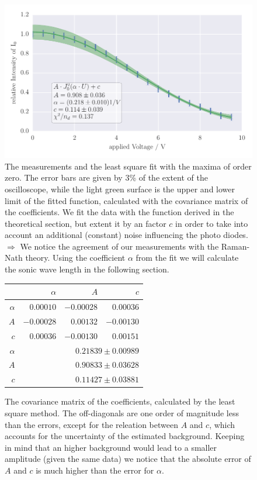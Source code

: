 \begin{figure}
    \centering
    \includegraphics[width=1\textwidth]{analysis/figures/besselfit_000}
    \caption{The measurements and the least square fit with the maxima of order zero. 
    The error bars are given by 3\% of the extent of the oscilloscope,
    while the light green surface is the upper and lower limit of the fitted function, calculated 
    with the covariance matrix of the coefficients. 
    We fit the data with the function derived in the theoretical
    section, but extent it by an factor $c$ in order to take into account an additional (constant) noise
    influencing the photo diodes. 
    \\
    $\Rightarrow$ We notice the agreement of our measurements with the Raman-Nath theory. Using the
    coefficient $\alpha$ from the fit we will calculate the sonic wave length in the following section.}
    \label{fig:besselfit_000}
\end{figure}
\begin{figure}
\caption{
The covariance matrix of the coefficients, calculated by the least square method. The off-diagonals are
one order of magnitude less than the errors, except for the releation between $A$ and $c$, which accounts for the
uncertainty of the estimated background. Keeping in mind that an higher background would lead to a smaller
amplitude (given the same data) we notice that the absolute error of $A$ and $c$ is much higher than the error for $\alpha$.
}
 \begin{tabular}{|r|r|r|r|}
 \hline 
\cellcolor{tabcolor}&\cellcolor{tabcolor}$\alpha$&\cellcolor{tabcolor}$A$&\cellcolor{tabcolor}$c$\\ \hline 
 \cellcolor{tabcolor}$\alpha$&$0.00010$ &$-0.00028$ &$0.00036$ \\ 
\cellcolor{tabcolor}$A$&$-0.00028$ &$0.00132$ &$-0.00130$ \\ 
\cellcolor{tabcolor}$c$&$0.00036$ &$-0.00130$ &$0.00151$ \\ \hline \hline
\cellcolor{tabcolor}$\alpha$&\multicolumn{3}{r|}{$0.21839 \pm 0.00989$ }\\ 
\cellcolor{tabcolor}$A$&\multicolumn{3}{r|}{$0.90833 \pm 0.03628$ }\\ 
\cellcolor{tabcolor}$c$&\multicolumn{3}{r|}{$0.11427 \pm 0.03881$ }\\ 
\hline\end{tabular}
\end{figure}


